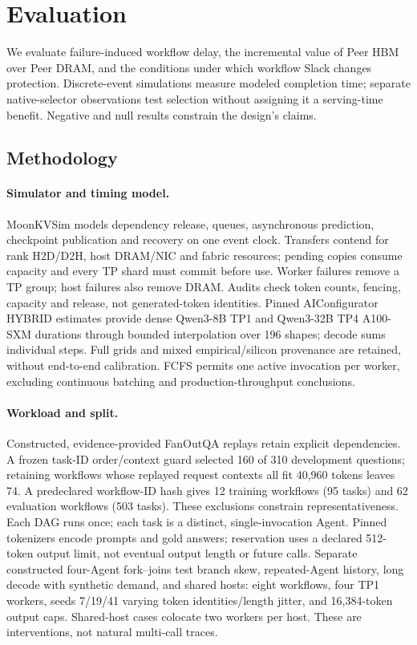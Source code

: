 \section{Evaluation}
\label{sec:evaluation}

We evaluate failure-induced workflow delay, the incremental value of Peer HBM
over Peer DRAM, and the conditions under which workflow Slack changes
protection. Discrete-event simulations measure modeled completion time;
separate native-selector observations test selection without assigning it a
serving-time benefit. Negative and null results constrain the design's claims.

\subsection{Methodology}
\label{sec:eval-method}

\paragraph{Simulator and timing model.}
MoonKVSim models dependency release, queues, asynchronous prediction,
checkpoint publication and recovery on one event clock. Transfers contend for
rank H2D/D2H, host DRAM/NIC and fabric resources; pending copies consume capacity
and every TP shard must commit before use. Worker failures remove a TP group;
host failures also remove DRAM. Audits check token counts, fencing, capacity
and release, not generated-token identities.
Pinned AIConfigurator HYBRID estimates\cite{eval2026aiconfigurator} provide
dense Qwen3-8B TP1 and Qwen3-32B TP4 A100-SXM durations through bounded
interpolation over 196 shapes; decode sums individual steps. Full grids and
mixed empirical/silicon provenance are retained, without end-to-end calibration.
FCFS permits one active invocation per worker, excluding continuous batching
and production-throughput conclusions.

\paragraph{Workload and split.}
Constructed, evidence-provided FanOutQA replays\cite{eval2024fanoutqa} retain
explicit dependencies. A frozen task-ID order/context guard selected 160 of
310 development questions; retaining workflows whose replayed request contexts
all fit 40,960 tokens leaves 74. A predeclared workflow-ID hash gives 12 training workflows (95 tasks) and
62 evaluation workflows (503 tasks). These exclusions constrain
representativeness. Each DAG runs once; each task is a distinct,
single-invocation Agent. Pinned tokenizers encode prompts and gold answers;
reservation uses a declared 512-token output limit, not eventual output length
or future calls.
Separate constructed four-Agent fork--joins test branch skew, repeated-Agent
history, long decode with synthetic demand, and shared hosts: eight workflows,
four TP1 workers, seeds 7/19/41 varying token identities/length jitter, and
16,384-token output caps. Shared-host cases colocate two workers per host.
These are interventions, not natural multi-call traces.

